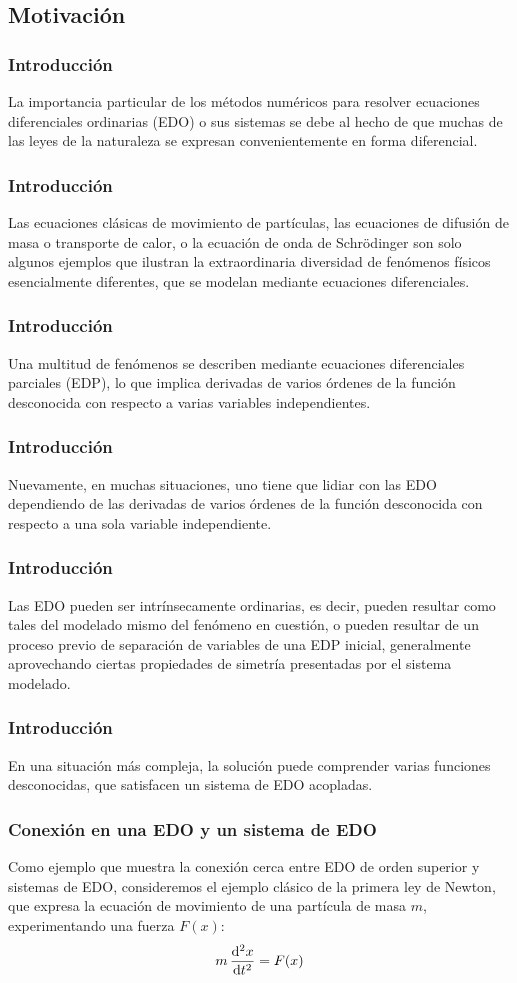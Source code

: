 \subsection{Motivación}
\begin{frame}
\frametitle{Introducción}
La importancia particular de los métodos numéricos para resolver ecuaciones diferenciales ordinarias (EDO) o sus sistemas se debe al hecho de que muchas de las leyes de la naturaleza se expresan convenientemente en forma diferencial.
\end{frame}
\begin{frame}
\frametitle{Introducción}
Las ecuaciones clásicas de movimiento de partículas, las ecuaciones de difusión de masa o transporte de calor, o la ecuación de onda de Schrödinger son solo algunos ejemplos que ilustran la extraordinaria diversidad de fenómenos físicos esencialmente diferentes, que se modelan mediante ecuaciones diferenciales.
\end{frame}
\begin{frame}
\frametitle{Introducción}
Una multitud de fenómenos se describen mediante ecuaciones diferenciales parciales (EDP), lo que implica derivadas de varios órdenes de la función desconocida con respecto a varias variables independientes.
\end{frame}
\begin{frame}
\frametitle{Introducción}
Nuevamente, en muchas situaciones, uno tiene que lidiar con las EDO dependiendo de las derivadas de varios órdenes de la función desconocida con respecto a una sola variable independiente.
\end{frame}
\begin{frame}
\frametitle{Introducción}
Las EDO pueden ser intrínsecamente ordinarias, es decir, pueden resultar como tales del modelado mismo del fenómeno en cuestión, o pueden resultar de un proceso previo de separación de variables de una EDP inicial, generalmente aprovechando ciertas propiedades de simetría presentadas por el sistema modelado.
\end{frame}
\begin{frame}
\frametitle{Introducción}
En una situación más compleja, la solución puede comprender varias funciones desconocidas, que satisfacen un sistema de EDO acopladas.
\end{frame}
\begin{frame}
\frametitle{Conexión en una EDO y un sistema de EDO}
Como ejemplo que muestra la conexión cerca entre EDO de orden superior y sistemas de EDO, consideremos el ejemplo clásico de la primera ley de Newton, que expresa la ecuación de movimiento de una partícula de masa $m$, experimentando una fuerza $F(x)$:
\begin{align}
m \, \dv[2]{x}{t} =  F(x)
\label{eq:ecuacion_12_01}
\end{align}
\end{frame}
